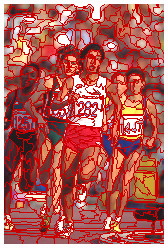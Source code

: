 \begin{figure}
{		\includegraphics[scale=\scalefivebsdtest]{pictures/bsd-test-8-ers}
	}
	\subfigure{
}
\end{figure}
